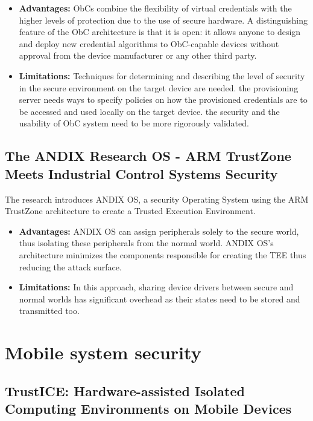\documentclass[conference]{IEEEtran}
\begin{document}
\begin{itemize}
    \item \textbf{Advantages:} ObCs combine the flexibility of virtual credentials with the higher levels of protection due to the use of secure hardware. A distinguishing feature of the ObC architecture is that it is open: it allows anyone to design and deploy new credential algorithms to ObC-capable devices without approval from the device manufacturer or any other third party.
    \item \textbf{Limitations:} Techniques for determining and describing the level of security in the secure environment on the target device are needed. the provisioning server needs ways to specify policies on how the provisioned credentials are to be accessed and used locally on the target device. the security and the usability of ObC system need to be more rigorously validated.
\end{itemize}


\subsection{The ANDIX Research OS - ARM TrustZone Meets Industrial Control Systems Security}
\cite{os4} The research introduces ANDIX OS, a security Operating System using the ARM TrustZone architecture to create a Trusted Execution Environment.
\begin{itemize}
    \item \textbf{Advantages:} ANDIX OS can assign peripherals solely to the secure world, thus isolating these peripherals from the normal world. ANDIX OS’s architecture minimizes the components responsible for creating the TEE thus reducing the attack surface.
    \item \textbf{Limitations:} In this approach, sharing device drivers between secure and normal worlds has significant overhead as their states need to be stored and transmitted too.
\end{itemize}

\section{Mobile system security}

\subsection{TrustICE: Hardware-assisted Isolated Computing Environments on Mobile Devices}
\end{document}
